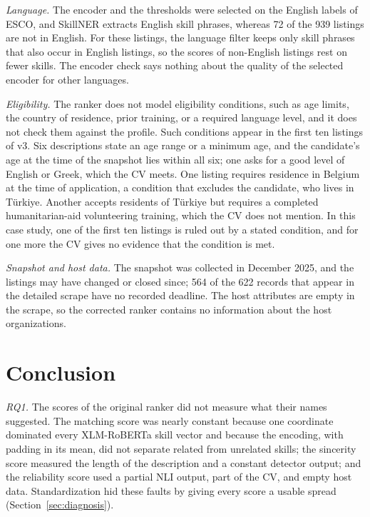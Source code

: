 \documentclass[CHICAGO]{USG}
\begin{document}
\emph{Language.} The encoder and the thresholds were selected on the English labels of ESCO, and SkillNER extracts English skill phrases, whereas 72 of the 939 listings are not in English. For these listings, the language filter keeps only skill phrases that also occur in English listings, so the scores of non-English listings rest on fewer skills. %
The encoder check says nothing about the quality of the selected encoder for other languages.

\emph{Eligibility.} The ranker does not model eligibility conditions, such as age limits, the country of residence, prior training, or a required language level, and it does not check them against the profile. Such conditions appear in the first ten listings of v3. Six descriptions state an age range or a minimum age, and the candidate's age at the time of the snapshot lies within all six; one asks for a good level of English or Greek, which the CV meets. One listing requires residence in Belgium at the time of application, a condition that excludes the candidate, who lives in T\"urkiye. Another accepts residents of T\"urkiye but requires a completed humanitarian-aid volunteering training, which the CV does not mention. %
In this case study, one of the first ten listings is ruled out by a stated condition, and for one more the CV gives no evidence that the condition is met.

\emph{Snapshot and host data.} The snapshot was collected in December 2025, and the listings may have changed or closed since; 564 of the 622 records that appear in the detailed scrape have no recorded deadline. The host attributes are empty in the scrape, so the corrected ranker contains no information about the host organizations. %


\section{Conclusion}
\label{sec:conclusion}

\emph{RQ1.} The scores of the original ranker did not measure what their names suggested. The matching score was nearly constant because one coordinate dominated every XLM-RoBERTa skill vector and because the encoding, with padding in its mean, did not separate related from unrelated skills; the sincerity score measured the length of the description and a constant detector output; and the reliability score used a partial NLI output, part of the CV, and empty host data. Standardization hid these faults by giving every score a usable spread (Section~\ref{sec:diagnosis}). %
\end{document}
